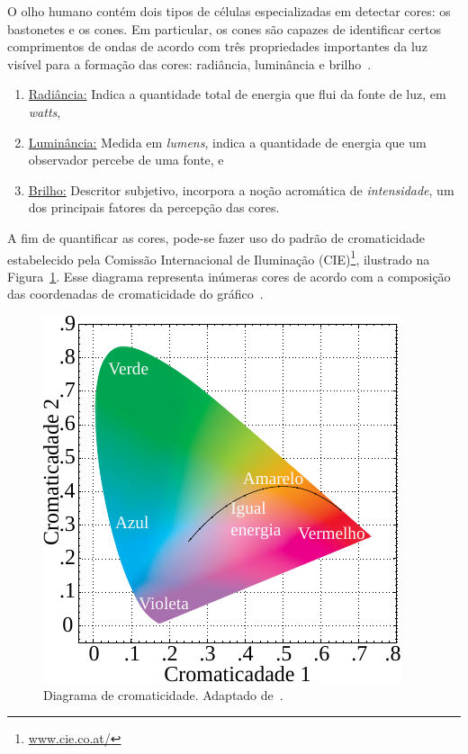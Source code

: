 O olho humano contém dois tipos de células especializadas em detectar cores: os bastonetes e os cones.
Em particular, os cones são capazes de identificar certos comprimentos de ondas de acordo com três propriedades importantes da luz visível para a formação das cores: radiância, luminância e brilho~\cite{Gonzalez2008}.

 \begin{enumerate}
    \item \underline{Radiância:} Indica a quantidade total de energia que flui da fonte de luz, em \textit{watts},
    
     \item \underline{Luminância:} Medida em \textit{lumens}, indica a quantidade de energia que um observador percebe de uma fonte, e
    
     \item \underline{Brilho:} Descritor subjetivo, incorpora a noção acromática de \textit{intensidade}, um dos principais fatores da percepção das cores.
\end{enumerate}

A fim de quantificar as cores, pode-se fazer uso do padrão de cromaticidade estabelecido pela Comissão Internacional de Iluminação (CIE)\footnote{\url{www.cie.co.at/}}, ilustrado na Figura~\ref{figCIE}.
Esse diagrama representa inúmeras cores de acordo com a composição das coordenadas de cromaticidade do gráfico~\cite{Gonzalez2008}.

\begin{figure}[!htb]
    \centering
    \includegraphics[scale=1]{_fig/cie.pdf}
    \caption[Diagrama de cromaticidade]{Diagrama de cromaticidade. Adaptado de~.}
    \label{figCIE}
\end{figure}

